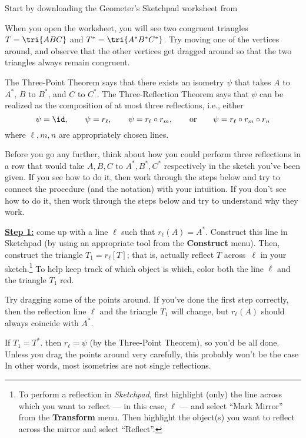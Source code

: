 \begin{TG} \label{threerefs}
Start by downloading the Geometer's Sketchpad worksheet from\\

When you open the worksheet, you will see two congruent triangles $T=\tri{ABC}$ and $T^*=\tri{A^*B^*C^*}$.
Try moving one of the vertices around, and observe that the other vertices get dragged around
so that the two triangles always remain congruent.

The Three-Point Theorem says that there exists an isometry $\psi$ that takes $A$ to $A^*$, $B$ to $B^*$,
and $C$ to $C^*$. The Three-Reflection Theorem says that $\psi$ can be realized as the composition
of at most three reflections, i.e., either
  $$\psi=\id,\qquad \psi=r_\ell,\qquad \psi=r_\ell\circ r_m,\qquad \text{or}\qquad \psi=r_\ell\circ r_m\circ r_n$$
where $\ell,m,n$ are appropriately chosen lines.

Before you go any further, think about how you could perform three reflections in a row that
would take $A,B,C$ to $A^*,B^*,C^*$ respectively in the sketch you've been given.  If you see how to do it,
then work through the steps below and try to connect the procedure (and the notation) with your intuition.
If you don't see how to do it, then work through the steps below and try to understand why they work.


\underline{\bf Step 1:} come up with a line $\ell$ such that $r_\ell(A)=A^*$.  Construct this line
in Sketchpad (by using an appropriate tool from the \textbf{Construct} menu).
Then, construct the triangle $T_1=r_\ell[T]$; that is, actually reflect $T$ across~$\ell$ in your
sketch.\footnote{To
perform a reflection in \textit{Sketchpad}, first highlight (only) the line across which
you want to reflect --- in this case, $\ell$ --- and select ``Mark Mirror'' from the
\textbf{Transform} menu.  Then highlight the object(s) you want to reflect across the
mirror and select ``Reflect''.}  To help keep track of which object is which, color both
the line $\ell$ and the triangle $T_1$ red.

Try dragging some of the points around.
If you've done the first step correctly, then the reflection line $\ell$ and the
triangle $T_1$ will change, but $r_\ell(A)$ should always coincide with $A^*$.

If $T_1=T^*$. then $r_\ell=\psi$ (by the Three-Point Theorem), so you'd be all done.
Unless you drag the points around very carefully, this probably won't be the case
In other words, most isometries are not single reflections.


\end{TG}
